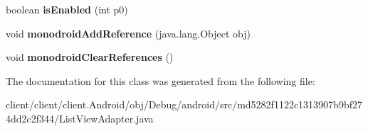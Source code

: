 \begin{DoxyCompactItemize}
\item 
\hypertarget{classmd5282f1122c1313907b9bf274dd2c2f344_1_1ListViewAdapter_a47e41758c45191e713d88cc3b40cc543}{}boolean {\bfseries is\+Enabled} (int p0)\label{classmd5282f1122c1313907b9bf274dd2c2f344_1_1ListViewAdapter_a47e41758c45191e713d88cc3b40cc543}

\item 
\hypertarget{classmd5282f1122c1313907b9bf274dd2c2f344_1_1ListViewAdapter_ad9cc9ae2ead9d6b7cc593d42eeb11f6e}{}void {\bfseries monodroid\+Add\+Reference} (java.\+lang.\+Object obj)\label{classmd5282f1122c1313907b9bf274dd2c2f344_1_1ListViewAdapter_ad9cc9ae2ead9d6b7cc593d42eeb11f6e}

\item 
\hypertarget{classmd5282f1122c1313907b9bf274dd2c2f344_1_1ListViewAdapter_a14679ded9aeb0a0c9eb5d613ec03e8bf}{}void {\bfseries monodroid\+Clear\+References} ()\label{classmd5282f1122c1313907b9bf274dd2c2f344_1_1ListViewAdapter_a14679ded9aeb0a0c9eb5d613ec03e8bf}

\end{DoxyCompactItemize}


The documentation for this class was generated from the following file\+:\begin{DoxyCompactItemize}
\item 
client/client/client.\+Android/obj/\+Debug/android/src/md5282f1122c1313907b9bf274dd2c2f344/List\+View\+Adapter.\+java\end{DoxyCompactItemize}
